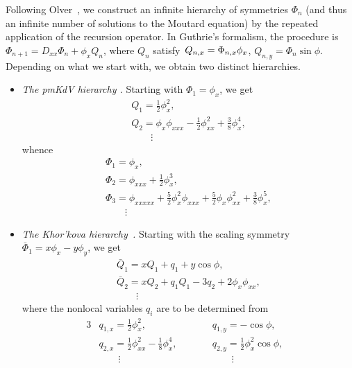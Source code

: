 \documentclass[pdftex]{sigma}
\numberwithin{equation}{section}
\theoremstyle{definition}
\begin{document}
 Following Olver~\cite{PJO-1977}, we construct an
infinite hierarchy of symmetries $\Phi_n$
(and thus an infinite number of solutions to the Moutard equation)
by the repeated application of the recursion operator.
In Guthrie's formalism, the procedure is
$
\Phi_{n + 1} = D_{xx} \Phi_n + \phi_x Q_n$,
where $Q_n$ satisfy~${
Q_{n,x} = \Phi_{n,x} \phi_x}$,
$
Q_{n,y} = \Phi_n \sin \phi$.
Depending on what we start with, we obtain two distinct hierarchies.
\begin{itemize}\itemsep=0pt
\item[(1)]
{\it The pmKdV hierarchy {\rm\cite[{\it Example}~6]{PJO-1977}}.}
Starting with $\Phi_1 = \phi_x$, we get
\begin{gather*}
Q_1 = \frac12 \phi_x^2,
\\
Q_2 =\phi_x \phi_{xxx} -\frac12 \phi_{xx}^2 + \frac38 \phi_x^4,
\\
\qquad\vdots
\end{gather*}
whence
\begin{gather}
\Phi_1 = \phi_x,
\nonumber\\
\Phi_2 = \phi_{xxx} + \frac12 \phi_x^3,
\nonumber\\
 \Phi_3
 = \phi_{xxxxx} + \frac52 \phi_x^2 \phi_{xxx}
 + \frac52 \phi_x \phi_{xx}^2 + \frac38 \phi_x^5,
\label{eq:hierarchy:pmKdV}
\\
\qquad\vdots
\nonumber
\end{gather}


\item[(2)] {\it The Khor'kova hierarchy~{\rm\cite[{\it Example}~2]{NGK-1988}}. }
Starting with the scaling symmetry
$\bar\Phi_1 = x \phi_x -\allowbreak y \phi_y$, we get
\begin{gather*}
\bar Q_1 = x Q_1 + q_1 + y \cos \phi,
\\
\bar Q_2 = x Q_2
 + q_1 Q_1
 - 3 q_2
 + 2 \phi_x \phi_{xx},
\\
\qquad\vdots
\end{gather*}
where the nonlocal variables $q_i$ are to be determined from{\samepage
\begin{alignat}{3}
& q_{1,x} = \frac{1}{2} \phi_x^2,
 \qquad &&
q_{1,y} = -{\cos \phi}, &\nonumber\\
& q_{2,x} = \frac{1}{2} \phi_{xx}^2 - \frac18 \phi_x^4,
 \qquad &&
q_{2,y} = \frac12 \phi_x^2 \cos \phi,&\label{eq:q}
\\
& \qquad\vdots && \qquad\vdots&\nonumber
\end{alignat}}%

\pagebreak


\end{itemize}
\end{document}
